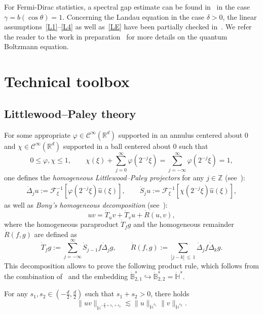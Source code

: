 \documentclass[10pt]{amsart}
\theoremstyle{definition}\newtheorem{defi}[theo]{Definition}\newtheorem{rema}[theo]{Remark}\newtheorem{exam}[theo]{Example}\newtheorem{exem}[theo]{Example}\newtheorem{nota}[theo]{Notation}
\newcommand{\R}{\mathbb{R}}
\newcommand{\Z}{\mathbb{Z}}
\newcommand{\bbH}{\mathbb{H}}
\newcommand{\bbB}{\mathbb{B}}
\newcommand{\CC}{\mathcal{C}}
\newcommand{\FF}{\mathcal{F}}
\renewcommand*\le{\leqslant}
\begin{document}
For Fermi-Dirac statistics, a spectral gap estimate can be found in~\cite{jiang} in the case $\gamma = b(\cos \theta) = 1$. Concerning the Landau equation in the case $\delta > 0$, the linear assumptions~\eqref{L1}--\eqref{L4} as well as~\eqref{LE} have been partially checked in~\cite{ABL}. We refer the reader to the work in preparation~\cite{GL2023} for more details on the quantum Boltzmann equation.

\section{Technical toolbox}\label{sec:toolbox}

\subsection{Littlewood--Paley theory}\label{scn:littlewood-paley}
For some appropriate $\varphi \in \CC^\infty(\R^d)$ supported in an annulus centered about $0$ and $\chi \in \CC^\infty(\R^d )$ supported in a ball centered about $0$ such that
\[
0 \le \varphi, \chi \le 1, \qquad \chi(\xi) + \sum_{j=0}^\infty \varphi\left(2^{-j} \xi \right) = \sum_{j=-\infty}^\infty \varphi\left(2^{-j} \xi \right) = 1,
\]
one defines the \emph{homogeneous Littlewood--Paley projectors} for any $j \in \Z$ (see~\cite[Section~2.2]{BCD2011}):
\begin{gather*}
\dot{\Delta}_j u := \FF^{-1}_\xi \left[\varphi\left(2^{-j} \xi \right) \widehat{u}(\xi) \right], \qquad \dot{S}_j u := \FF^{-1}_\xi \left[\chi\left(2^{-j} \xi \right) \widehat{u}(\xi) \right],
\end{gather*}
as well as \emph{Bony's homogeneous decomposition} (see~\cite[Section~2.6.1]{BCD2011}):
\[
u v = \dot{T}_u v + \dot{T}_v u + \dot{R}(u, v),
\]
where the homogeneous paraproduct $\dot{T}_f g$ and the homogeneous remainder $\dot{R}(f, g)$ are defined as
\[
\dot{T}_f g := \sum_{j=-\infty}^\infty \dot{S}_{j-1} f \dot{\Delta}_j g, \qquad \dot{R}(f, g) := \sum_{|j - k|\,\le\,1} \dot{\Delta}_j f \dot{\Delta}_k g.
\]
This decomposition allows to prove the following product rule, which follows from the combination of~\cite[Corollary~2.55]{BCD2011} and the embedding $\dot{\bbB}^s_{2, 1} \hookrightarrow \dot{\bbB}^s_{2, 2} = \dot{\bbH}^s$.
\begin{prop}\label{prop:product_homogeneous_sobolev}
For any $s_1, s_2 \in (-\frac{d}{2}, \frac{d}{2})$ such that $s_1 + s_2 > 0$, there holds
\[
\| u v \|_{ \dot{\bbH}^{-\frac{d}{2} + s_1 + s_2} } \lesssim \| u \|_{ \dot{\bbH}^{s_1} } \| v \|_{ \dot{\bbH}^{s_2} }.
\]
\end{prop}
\end{document}
